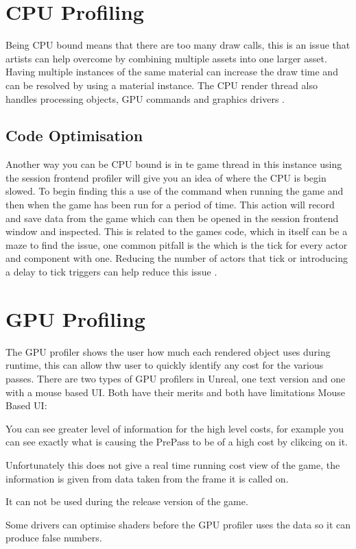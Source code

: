 \documentclass{scrartcl}
\begin{document}
\section{CPU Profiling}
Being CPU bound means that there are too many draw calls, this is an issue that artists can help overcome by combining multiple assets into one larger asset. Having multiple instances of the same material can increase the draw time and can be resolved by using a material instance. The CPU render thread also handles processing objects, GPU commands and graphics drivers \cite{UECPU}.

\subsection{Code Optimisation}
Another way you can be CPU bound is in te game thread in this instance using the session frontend profiler will give you an idea of where the CPU is begin slowed. To begin finding this a use of the command  when running the game and then  when the game has been run for a period of time. This action will record and save data from the game which can then be opened in the session frontend window and inspected. This is related to the games code, which in itself can be a maze to find the issue, one common pitfall is the  which is the tick for every actor and component with one. Reducing the number of actors that tick or introducing a delay to tick triggers can help reduce this issue \cite{BlogUnreal}.

\section{GPU Profiling}
The GPU profiler shows the user how much each rendered object uses during runtime, this can allow thw user to quickly identify any cost for the various passes. There are two types of GPU profilers in Unreal, one text version and one with a mouse based UI. Both have their merits and both have limitations
\newline
Mouse Based UI:
\begin{description}[font=$\bullet$~\normalfont\scshape\color{red!50!black}]
\item You can see greater level of information for the high level costs, for example you can see exactly what is causing the PrePass to be of a high cost by clikcing on it.
\item Unfortunately this does not give a real time running cost view of the game, the information is given from data taken from the frame it is called on.
\item It can not be used during the release version of the game.
\item Some drivers can optimise shaders before the GPU profiler uses the data so it can produce false numbers.
\end{description}
\end{document}

